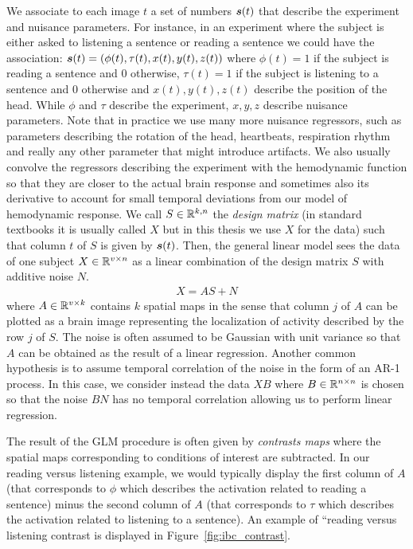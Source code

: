 We associate to each image $t$ a set of numbers $\boldsymbol{s}(t)$ that describe the experiment and
nuisance parameters.
For instance, in an experiment where the subject is either asked to listening a
sentence or reading a sentence we could have the association: $\boldsymbol{s}(t) = (\phi(t), \tau(t), x(t), y(t),
z(t))$ where $\phi(t)=1$ if the subject is reading a sentence and $0$ otherwise, $\tau(t)=1$
if the subject is listening to a sentence and $0$ otherwise and  $x(t), y(t), z(t)$ describe the
position of the head. While $\phi$ and $\tau$ describe the experiment, $x, y, z$
describe nuisance parameters.
Note that in practice we use many more nuisance regressors, such
as parameters describing the rotation of the head, heartbeats, respiration
rhythm and really any other parameter that might introduce artifacts. We also
usually convolve the regressors describing the experiment with the hemodynamic
function so that they are closer to the actual brain response and sometimes also its derivative to account for small temporal deviations from our model of hemodynamic response.
We call $S \in \mathbb{R}^{k, n}$ the \emph{design matrix} (in standard textbooks it is
usually called $X$ but in this thesis we use $X$ for the data) such that column
$t$ of $S$ is given by $\boldsymbol{s}(t)$.
Then, the general linear model sees the data of one subject $X \in \mathbb{R}^{v \times n}$ as a linear combination of the
design matrix $S$ with additive noise $N$.
\begin{align}
X = A S + N
\end{align}
where $A \in \mathbb{R}^{v \times k}$ contains $k$ spatial maps in the sense that column $j$
of $A$ can be plotted as a brain image representing the localization of activity
described by the row $j$ of $S$.
The noise is often assumed to be Gaussian with unit variance so that $A$ can be obtained as the
result of a linear regression. Another common hypothesis is to assume temporal
correlation of the noise in the form of an AR-1 process. In this case, we 
consider instead the data $XB$ where $B \in \mathbb{R}^{n \times n}$ is chosen so that the
noise $BN$ has no temporal correlation allowing us to perform linear regression.

The result of the GLM procedure is often given by \emph{contrasts maps} where
the spatial maps corresponding to conditions of interest are subtracted.
In our reading versus listening example, we would typically display the first column of
$A$ (that corresponds to $\phi$ which describes the activation related to
reading a sentence) minus
the second column of $A$ (that corresponds to $\tau$ which describes the
activation related to listening to a sentence). An example of ``reading versus listening contrast is displayed in
Figure~\ref{fig:ibc_contrast}.

